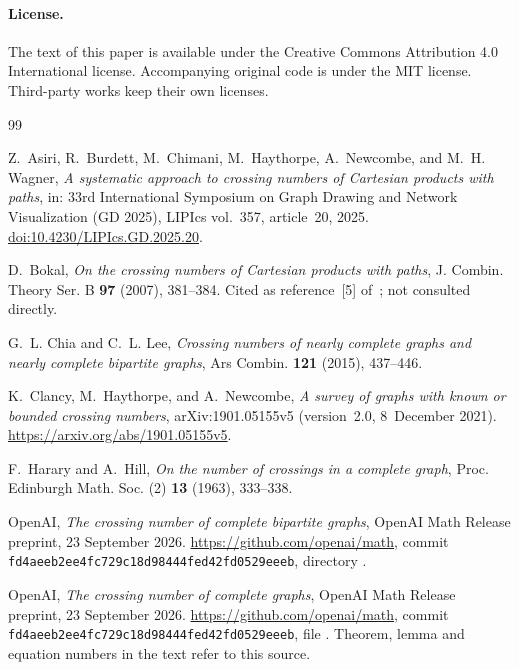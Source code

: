 \documentclass[11pt,a4paper]{article}
\newcommand{\doi}[1]{\href{https://doi.org/#1}{doi:#1}}
\theoremstyle{definition}
\theoremstyle{remark}
\numberwithin{equation}{section}
\begin{document}
\paragraph{License.} The text of this paper is available under the Creative Commons Attribution 4.0 International license. Accompanying original code is under the MIT license. Third-party works keep their own licenses.

\begingroup
\small
\raggedright
\begin{thebibliography}{99}

Z.~Asiri, R.~Burdett, M.~Chimani, M.~Haythorpe, A.~Newcombe, and M.~H. Wagner,
\emph{A systematic approach to crossing numbers of Cartesian products with paths},
in: 33rd International Symposium on Graph Drawing and Network Visualization (GD 2025), LIPIcs vol.~357, article~20, 2025.
\doi{10.4230/LIPIcs.GD.2025.20}.

D.~Bokal,
\emph{On the crossing numbers of Cartesian products with paths},
J. Combin. Theory Ser. B \textbf{97} (2007), 381--384.
Cited as reference~[5] of~\cite{OWH}; not consulted directly.

G.~L. Chia and C.~L. Lee,
\emph{Crossing numbers of nearly complete graphs and nearly complete bipartite graphs},
Ars Combin. \textbf{121} (2015), 437--446.

K.~Clancy, M.~Haythorpe, and A.~Newcombe,
\emph{A survey of graphs with known or bounded crossing numbers},
arXiv:1901.05155v5 (version~2.0, 8~December 2021).
\url{https://arxiv.org/abs/1901.05155v5}.

F.~Harary and A.~Hill,
\emph{On the number of crossings in a complete graph},
Proc. Edinburgh Math. Soc. (2) \textbf{13} (1963), 333--338.

OpenAI,
\emph{The crossing number of complete bipartite graphs},
OpenAI Math Release preprint, 23 September 2026.
\url{https://github.com/openai/math}, commit \texttt{fd4aeeb2ee4fc729c18d98444fed42fd0529eeeb}, directory .

OpenAI,
\emph{The crossing number of complete graphs},
OpenAI Math Release preprint, 23 September 2026.
\url{https://github.com/openai/math}, commit \texttt{fd4aeeb2ee4fc729c18d98444fed42fd0529eeeb}, file .
Theorem, lemma and equation numbers in the text refer to this source.


\end{thebibliography}
\end{document}
